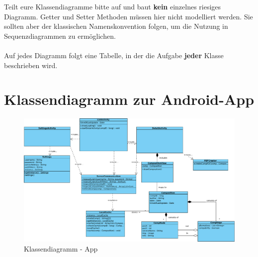 \begin{tcolorbox}
Teilt eure Klassendiagramme bitte auf und baut \textbf{kein} einzelnes riesiges Diagramm.
Getter und Setter Methoden müssen hier nicht modelliert werden.
Sie sollten aber der klassischen Namenskonvention folgen, um die Nutzung in Sequenzdiagrammen zu ermöglichen.
\\\\
Auf jedes Diagramm folgt eine Tabelle, in der die Aufgabe \textbf{jeder} Klasse beschrieben wird.
\end{tcolorbox}

\section*{Klassendiagramm zur Android-App}

\begin{figure}[h]
	\centering
	\includegraphics[width=\textwidth]{Klassendiagramm_App/Class_Diagram1}
	\caption{Klassendiagramm - App}
	\label{fig:klassendiagramm-a}
\end{figure}

